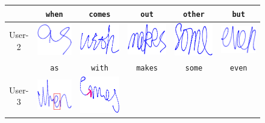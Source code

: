 \begin{figure}[!t]
\begin{tabular}{cccccc}
 & \texttt{when} %
 & \texttt{comes} & \texttt{out}  & \texttt{other} & \texttt{but} \\ 
\hline 
User-2
& 
{\includegraphics[width=0.09\columnwidth]{./Graphic/words_meng/10023_pdf.eps}}
& 
{\includegraphics[width=0.09\columnwidth]{./Graphic/words_meng/10030_pdf.eps}}
& 
{\includegraphics[width=0.09\columnwidth]{./Graphic/words_meng/20019_pdf.eps}}
& 
{\includegraphics[width=0.09\columnwidth]{./Graphic/words_meng/20028_pdf.eps}}
& 
{\includegraphics[width=0.09\columnwidth]{./Graphic/words_meng/20033_pdf.eps}}
\\ 
 & \texttt{as} %
 & \texttt{with} & \texttt{makes}  & \texttt{some} & \texttt{even} \\ 
\hline
User-3
& 
{\includegraphics[width=0.09\columnwidth]{./Graphic/words_cao/10001_pdfCopy.eps}}
& 
{\includegraphics[width=0.09\columnwidth]{./Graphic/words_cao/10003_pdfCopy.eps}}

\end{tabular}
\end{figure}
